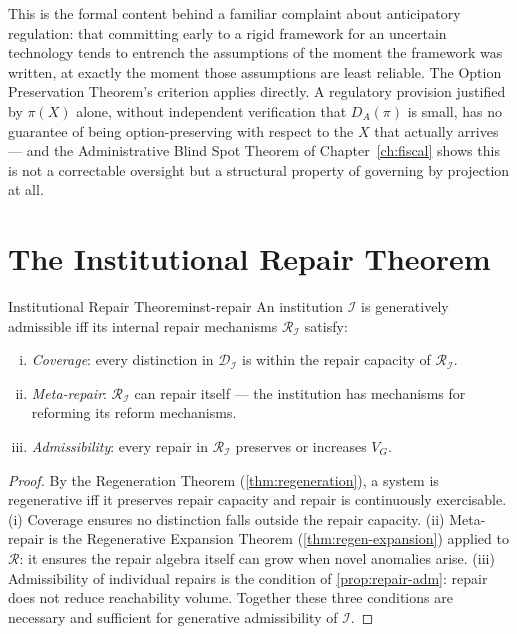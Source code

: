 \documentclass[12pt,twoside,openright]{book}
\begin{document}
This is the formal content behind a familiar complaint about
anticipatory regulation: that committing early to a rigid
framework for an uncertain technology tends to entrench the
assumptions of the moment the framework was written, at
exactly the moment those assumptions are least reliable. The
Option Preservation Theorem's criterion applies directly.
A regulatory provision justified by $\pi(X)$ alone, without
independent verification that $D_A(\pi)$ is small, has no
guarantee of being option-preserving with respect to the $X$
that actually arrives --- and the Administrative Blind Spot
Theorem of Chapter~\ref{ch:fiscal} shows this is not a
correctable oversight but a structural property of governing
by projection at all.

\section{The Institutional Repair Theorem}

\begin{theorem}{Institutional Repair Theorem}{inst-repair}
  An institution $\mathcal{I}$ is generatively
  admissible iff its internal repair mechanisms
  $\mathcal{R}_\mathcal{I}$ satisfy:
  \begin{enumerate}[(i)]
    \item \emph{Coverage}: every distinction in
          $\mathcal{D}_\mathcal{I}$ is within the
          repair capacity of $\mathcal{R}_\mathcal{I}$.
    \item \emph{Meta-repair}: $\mathcal{R}_\mathcal{I}$
          can repair itself — the institution has
          mechanisms for reforming its reform mechanisms.
    \item \emph{Admissibility}: every repair in
          $\mathcal{R}_\mathcal{I}$ preserves or
          increases $V_G$.
  \end{enumerate}
\end{theorem}

\begin{proof}
  By the Regeneration Theorem (\cref{thm:regeneration}),
  a system is regenerative iff it preserves repair
  capacity and repair is continuously exercisable.
  (i) Coverage ensures no distinction falls outside
  the repair capacity.
  (ii) Meta-repair is the Regenerative Expansion Theorem
  (\cref{thm:regen-expansion}) applied to $\mathcal{R}$:
  it ensures the repair algebra itself can grow when
  novel anomalies arise.
  (iii) Admissibility of individual repairs is the
  condition of \cref{prop:repair-adm}: repair does not
  reduce reachability volume.
  Together these three conditions are necessary and
  sufficient for generative admissibility of
  $\mathcal{I}$.
\end{proof}
\end{document}
